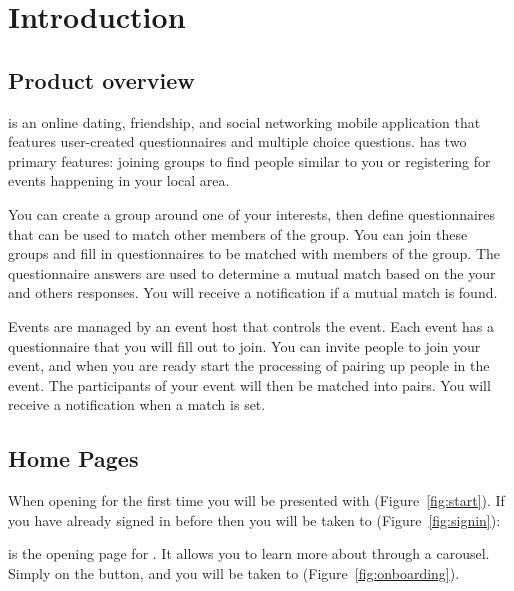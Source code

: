 \section{Introduction}
\label{sec:introduction}

\subsection{Product overview}
\label{sec:overview}

\Friending{} is an online dating, friendship, and social networking mobile application that features user-created questionnaires and multiple choice questions.  \Friending{} has two primary features: joining groups to find people similar to you or registering for events happening in your local area.

You can create a group around one of your interests, then define questionnaires that can be used to match other members of the group.  You can join these groups and fill in questionnaires to be matched with members of the group.  The questionnaire answers are used to determine a mutual match based on the your and others responses.  You will receive a notification if a mutual match is found.

Events are managed by an event host that controls the event.  Each event has a questionnaire that you will fill out to join.  You can invite people to join your event, and when you are ready start the processing of pairing up people in the event.    The participants of your event will then be matched into pairs.  You will receive a notification when a match is set.

\subsection{Home Pages}
\label{sec:homepages}

When opening \Friending{} for the first time you will be presented with  (Figure~\ref{fig:start}).   If you have already signed in before then you will be taken to  (Figure~\ref{fig:signin}):


 is the opening page for \Friending{}. It allows you to learn more about \Friending{} through a carousel.  Simply  on the  button, and you will be taken to  (Figure~\ref{fig:onboarding}).

